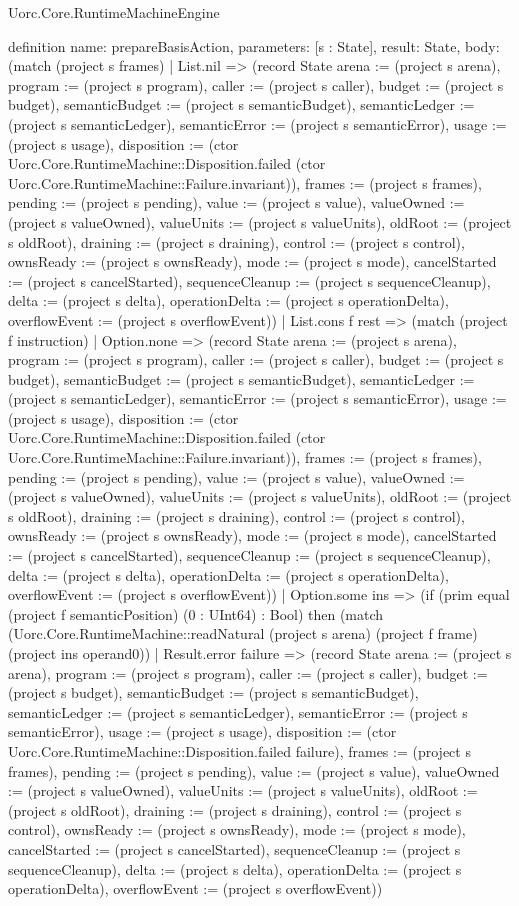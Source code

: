 \begin{lexlean}{Uorc.Core.RuntimeMachineEngine}
\begin{semanticmodule}
definition{
  name: prepareBasisAction,
  parameters: [s : State],
  result: State,
  body: (match (project s frames)
    | List.nil => (record State {arena := (project s arena), program := (project s program), caller := (project s caller), budget := (project s budget), semanticBudget := (project s semanticBudget), semanticLedger := (project s semanticLedger), semanticError := (project s semanticError), usage := (project s usage), disposition := (ctor Uorc.Core.RuntimeMachine::Disposition.failed (ctor Uorc.Core.RuntimeMachine::Failure.invariant)), frames := (project s frames), pending := (project s pending), value := (project s value), valueOwned := (project s valueOwned), valueUnits := (project s valueUnits), oldRoot := (project s oldRoot), draining := (project s draining), control := (project s control), ownsReady := (project s ownsReady), mode := (project s mode), cancelStarted := (project s cancelStarted), sequenceCleanup := (project s sequenceCleanup), delta := (project s delta), operationDelta := (project s operationDelta), overflowEvent := (project s overflowEvent)})
    | List.cons f rest => (match (project f instruction)
      | Option.none => (record State {arena := (project s arena), program := (project s program), caller := (project s caller), budget := (project s budget), semanticBudget := (project s semanticBudget), semanticLedger := (project s semanticLedger), semanticError := (project s semanticError), usage := (project s usage), disposition := (ctor Uorc.Core.RuntimeMachine::Disposition.failed (ctor Uorc.Core.RuntimeMachine::Failure.invariant)), frames := (project s frames), pending := (project s pending), value := (project s value), valueOwned := (project s valueOwned), valueUnits := (project s valueUnits), oldRoot := (project s oldRoot), draining := (project s draining), control := (project s control), ownsReady := (project s ownsReady), mode := (project s mode), cancelStarted := (project s cancelStarted), sequenceCleanup := (project s sequenceCleanup), delta := (project s delta), operationDelta := (project s operationDelta), overflowEvent := (project s overflowEvent)})
      | Option.some ins => (if (prim equal (project f semanticPosition) (0 : UInt64) : Bool) then (match (Uorc.Core.RuntimeMachine::readNatural (project s arena) (project f frame) (project ins operand0))
        | Result.error failure => (record State {arena := (project s arena), program := (project s program), caller := (project s caller), budget := (project s budget), semanticBudget := (project s semanticBudget), semanticLedger := (project s semanticLedger), semanticError := (project s semanticError), usage := (project s usage), disposition := (ctor Uorc.Core.RuntimeMachine::Disposition.failed failure), frames := (project s frames), pending := (project s pending), value := (project s value), valueOwned := (project s valueOwned), valueUnits := (project s valueUnits), oldRoot := (project s oldRoot), draining := (project s draining), control := (project s control), ownsReady := (project s ownsReady), mode := (project s mode), cancelStarted := (project s cancelStarted), sequenceCleanup := (project s sequenceCleanup), delta := (project s delta), operationDelta := (project s operationDelta), overflowEvent := (project s overflowEvent)})
}
\end{semanticmodule}
\end{lexlean}
